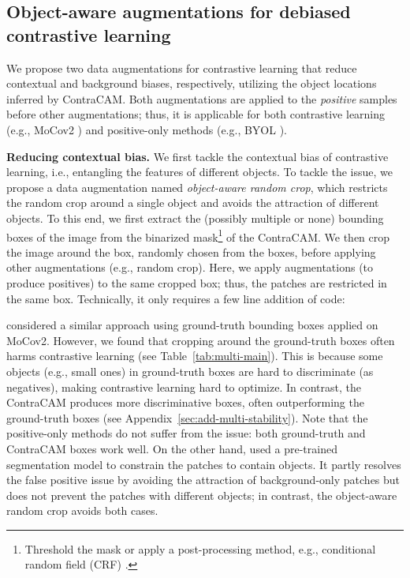 \documentclass{article}
\begin{document}
\subsection{Object-aware augmentations for debiased contrastive learning}
\label{sec:method-debias}

We propose two data augmentations for contrastive learning that reduce contextual and background biases, respectively, utilizing the object locations inferred by ContraCAM. Both augmentations are applied to the \textit{positive} samples before other augmentations; thus, it is applicable for both contrastive learning (e.g., MoCov2 \citep{chen2020improved}) and positive-only methods (e.g., BYOL \citep{grill2020bootstrap}).


\textbf{Reducing contextual bias.}
We first tackle the contextual bias of contrastive learning, i.e., entangling the features of different objects. To tackle the issue, we propose a data augmentation named \textit{object-aware random crop}, which restricts the random crop around a single object and avoids the attraction of different objects. To this end, we first extract the (possibly multiple or none) bounding boxes of the image from the binarized mask\footnote{Threshold the mask or apply a post-processing method, e.g., conditional random field (CRF) \citep{lafferty2001conditional}.} of the ContraCAM. We then crop the image around the box, randomly chosen from the boxes, before applying other augmentations (e.g., random crop). Here, we apply augmentations (to produce positives) to the same cropped box; thus, the patches are restricted in the same box. Technically, it only requires a few line addition of code:



\citet{purushwalkam2020demystifying} considered a similar approach using ground-truth bounding boxes applied on MoCov2. However, we found that cropping around the ground-truth boxes often harms contrastive learning (see Table~\ref{tab:multi-main}). This is because some objects (e.g., small ones) in ground-truth boxes are hard to discriminate (as negatives), making contrastive learning hard to optimize. In contrast, the ContraCAM produces more discriminative boxes, often outperforming the ground-truth boxes (see Appendix~\ref{sec:add-multi-stability}). Note that the positive-only methods do not suffer from the issue: both ground-truth and ContraCAM boxes work well. On the other hand, \citet{selvaraju2021casting} used a pre-trained segmentation model to constrain the patches to contain objects. It partly resolves the false positive issue by avoiding the attraction of background-only patches but does not prevent the patches with different objects; in contrast, the object-aware random crop avoids both cases.
\end{document}
